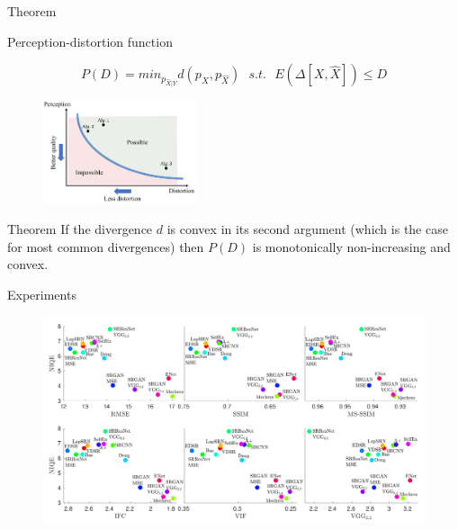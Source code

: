 \documentclass[xcolor=pdftex,dvipsnames,table,mathserif]{beamer}
\begin{document}
\begin{frame}{Theorem}

\begin{block}{Perception-distortion function}

  $$
  P(D) = min_{p_{\hat{X} | Y}} d(p_X, p_{\hat{X}})~~~ s.t.~~~ E(\Delta[X, \hat{X}]) \leq D
  $$

\end{block}

\pause

\begin{figure}[ht]
  \centering
  \includegraphics[width=0.4\textwidth]{impossible}
\end{figure}

\pause

\begin{block}{Theorem}
  If the divergence $d$ is convex in its second argument (which is the case for most common divergences) then $P(D)$ is monotonically non-increasing and convex.
\end{block}


\end{frame}



\begin{frame}{Experiments}

\begin{figure}[ht]
  \centering
  \includegraphics[width=\textwidth]{niqe}
\end{figure}


\end{frame}
\end{document}
